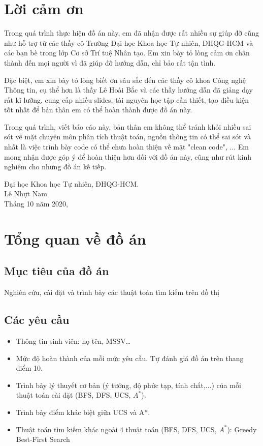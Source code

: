 \documentclass{article}
\begin{document}
\cleardoublepage
{}
{}
\section*{Lời cảm ơn}
\vspace{1.0in}
\begingroup
\setlength{\parindent}{0pt}
Trong quá trình thực hiện đồ án này, em đã nhận được rất nhiều sự giúp đỡ cũng như hỗ trợ từ các thầy cô Trường Đại học Khoa học Tự nhiên, ĐHQG-HCM và các bạn bè trong lớp Cơ sở Trí tuệ Nhân tạo. Em xin bày tỏ lòng cảm ơn chân thành đến mọi người vì đã giúp đỡ hướng dẫn, chỉ bảo rất tận tình.

Đặc biệt, em xin bày tỏ lòng biết ơn sâu sắc đến các thầy cô khoa Công nghệ Thông tin, cụ thể hơn là thầy Lê Hoài Bắc và các thầy hướng dẫn đã giảng dạy rất kĩ lưỡng, cung cấp nhiều slides, tài nguyên học tập cần thiết, tạo điều kiện tốt nhất để bản thân em có thể hoàn thành được đồ án này.

Trong quá trình, viết báo cáo này, bản thân em không thể tránh khỏi nhiều sai sót về mặt chuyên môn phân tích thuật toán, nguồn thông tin có thể sai sót và nhất là việc trình bày code có thể chưa hoàn thiện về mặt "clean code", ... Em mong nhận được góp ý để hoàn thiện hơn đối với đồ án này, cũng như rút kinh nghiệm cho những đồ án kế tiếp.
\par


{Đại học Khoa học Tự nhiên, ĐHQG-HCM.}\\
Lê Nhựt Nam\\
Tháng 10 năm 2020,\\
\endgroup

\newpage
\tableofcontents
\newpage
{} %

\section{Tổng quan về đồ án}
\subsection{Mục tiêu của đồ án}
\setlength{\parindent}{10ex}
Nghiên cứu, cài đặt và trình bày các thuật toán tìm kiếm trên đồ thị


\subsection{Các yêu cầu}
\begin{itemize}
	\item Thông tin sinh viên: họ tên, MSSV…
	\item Mức độ hoàn thành của mỗi mức yêu cầu. Tự đánh giá đồ án trên thang điểm 10.
	\item Trình bày lý thuyết cơ bản (ý tưởng, độ phức tạp, tính chất,...) của mỗi thuật toán cài đặt (BFS, DFS, UCS, $A^{*}$).
	\item Trình bày điểm khác biệt giữa UCS và A*.
	\item Thuật toán tìm kiếm khác ngoài 4 thuật toán (BFS, DFS, UCS, $A^{*}$): Greedy Best-First Search
\end{itemize}
\end{document}
